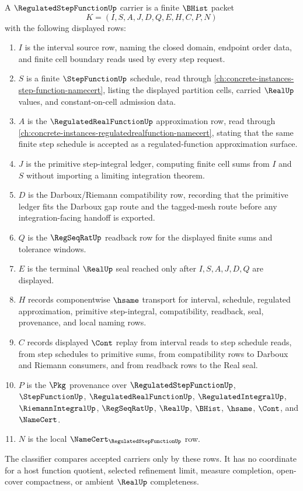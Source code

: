 \begin{definition}
\label{def:regulated-step-function-carrier}
A $\RegulatedStepFunctionUp$ carrier is a finite $\BHist$ packet
$$
K=(I,S,A,J,D,Q,E,H,C,P,N)
$$
with the following displayed rows:
\begin{enumerate}
\item $I$ is the interval source row, naming the closed domain, endpoint order data, and finite cell boundary reads used by every step request.
\item $S$ is a finite $\StepFunctionUp$ schedule, read through \autoref{ch:concrete-instances-step-function-namecert}, listing the displayed partition cells, carried $\RealUp$ values, and constant-on-cell admission data.
\item $A$ is the $\RegulatedRealFunctionUp$ approximation row, read through \autoref{ch:concrete-instances-regulatedrealfunction-namecert}, stating that the same finite step schedule is accepted as a regulated-function approximation surface.
\item $J$ is the primitive step-integral ledger, computing finite cell sums from $I$ and $S$ without importing a limiting integration theorem.
\item $D$ is the Darboux/Riemann compatibility row, recording that the primitive ledger fits the Darboux gap route and the tagged-mesh route before any integration-facing handoff is exported.
\item $Q$ is the $\RegSeqRatUp$ readback row for the displayed finite sums and tolerance windows.
\item $E$ is the terminal $\RealUp$ seal reached only after $I,S,A,J,D,Q$ are displayed.
\item $H$ records componentwise $\hsame$ transport for interval, schedule, regulated approximation, primitive step-integral, compatibility, readback, seal, provenance, and local naming rows.
\item $C$ records displayed $\Cont$ replay from interval reads to step schedule reads, from step schedules to primitive sums, from compatibility rows to Darboux and Riemann consumers, and from readback rows to the Real seal.
\item $P$ is the $\Pkg$ provenance over $\RegulatedStepFunctionUp$, $\StepFunctionUp$, $\RegulatedRealFunctionUp$, $\RegulatedIntegralUp$, $\RiemannIntegralUp$, $\RegSeqRatUp$, $\RealUp$, $\BHist$, $\hsame$, $\Cont$, and $\NameCert$.
\item $N$ is the local $\NameCert_{\RegulatedStepFunctionUp}$ row.
\end{enumerate}
The classifier compares accepted carriers only by these rows. It has no coordinate for a host function quotient, selected refinement limit, measure completion, open-cover compactness, or ambient $\RealUp$ completeness.
\end{definition}

